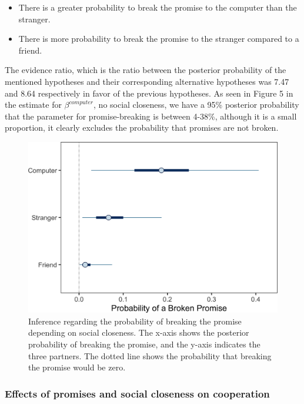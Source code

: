 \documentclass[smallextended]{svjour3}       %
\begin{document}
\begin{itemize}
\item
  There is a greater probability to break the promise to the computer
  than the stranger.
\item
  There is more probability to break the promise to the stranger
  compared to a friend.
\end{itemize}

The evidence ratio, which is the ratio between the posterior probability
of the mentioned hypotheses and their corresponding alternative
hypotheses was 7.47 and 8.64 respectively in favor of the previous
hypotheses. As seen in Figure 5 in the estimate for
\(\beta^{computer}\), no social closeness, we have a 95\% posterior
probability that the parameter for promise-breaking is between 4-38\%,
although it is a small proportion, it clearly excludes the probability
that promises are not broken.

\begin{figure}

{\centering \includegraphics[width=0.8\linewidth]{behavioral-promises_files/figure-latex/fig3-1} 

}

\caption{Inference regarding the probability of breaking the promise depending on social closeness. The x-axis shows the posterior probability of breaking the promise, and the y-axis indicates the three partners. The dotted line shows the probability that breaking the promise would be zero.}\label{fig:fig3}
\end{figure}

\hypertarget{effects-of-promises-and-social-closeness-on-cooperation}{%
\subsubsection{Effects of promises and social closeness on
cooperation}\label{effects-of-promises-and-social-closeness-on-cooperation}}
\end{document}
